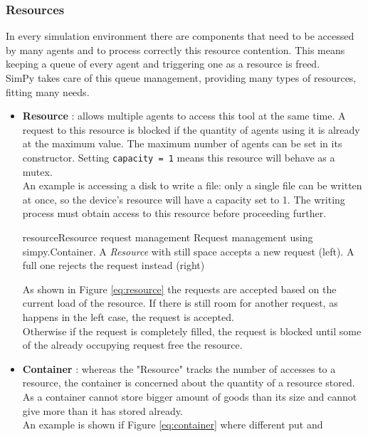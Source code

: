 \subsubsection{Resources}
In every simulation environment there are components that need to be accessed
by many agents and to process correctly this resource contention. This means
keeping a queue of every agent and triggering one as a resource is freed. \\
SimPy takes care of this queue management, providing many types of resources,
fitting many needs.
\begin{itemize}
    \item \textbf{Resource} \cite{simpy-resource}: 
        allows multiple agents to access this tool at the same time. A
        request to this resource is blocked if the quantity of agents using it
        is already at the maximum value. The maximum number of agents
        can be set in its constructor. Setting \texttt{capacity = 1} means this
        resource will behave as a mutex. \\
        An example is accessing a disk to write a file: only a single file can be
        written at once, so the device's resource will have a capacity set to 1.
        The writing process must obtain access to this resource before
        proceeding further. \\
        \begin{myimage}{resource}{Resource request management}
            Request management using simpy.Container. A \textit{Resource} with
            still space accepts a new request (left). A full one rejects the
            request instead (right)
        \end{myimage}
        As shown in Figure \ref{eq:resource} the requests are accepted based on
        the current load of the resource. If there is still room for another
        request, as happens in the left case, the request is accepted. \\
        Otherwise if the request is completely filled, the request is blocked
        until some of the already occupying request free the resource.
    \item \textbf{Container} \cite{simpy-container}: whereas the "Resource"
        tracks the number of accesses to a resource, the container is concerned
        about the quantity of a resource stored. As a container cannot store
        bigger amount of goods than its size and cannot give more than it has
        stored already.  \\
        An example is shown if Figure \ref{eq:container} where different put and

\end{itemize}
